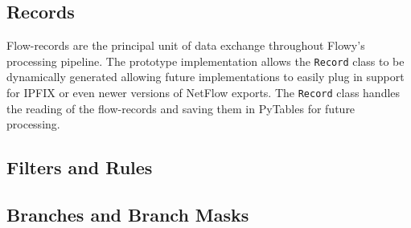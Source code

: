 \subsection{Records}\label{subsec:records}
Flow-records are the principal unit of data exchange throughout Flowy's processing pipeline. The prototype implementation allows the \texttt{Record} class to be dynamically generated allowing future implementations to easily plug in support for \ac{IPFIX} or even newer versions of NetFlow \cite{rfc3954} exports. The \texttt{Record} class handles the reading of the flow-records and saving them in PyTables for future processing.

\subsection{Filters and Rules}\label{subsec:filters-rules}


\subsection{Branches and Branch Masks}\label{subsec:branches-branchmasks}
